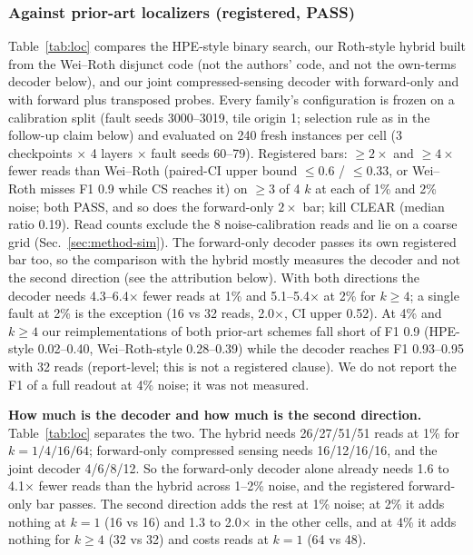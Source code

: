 \documentclass[journal]{IEEEtran}
\begin{document}
\subsubsection{Against prior-art localizers (registered, PASS)}
Table~\ref{tab:loc} compares the HPE-style binary search, our Roth-style hybrid built from the Wei--Roth disjunct code (not the authors' code, and not the own-terms decoder below), and our joint compressed-sensing decoder with forward-only and with forward plus transposed probes. Every family's configuration is frozen on a calibration split (fault seeds 3000--3019, tile origin 1; selection rule as in the follow-up claim below) and evaluated on 240 fresh instances per cell (3 checkpoints $\times$ 4 layers $\times$ fault seeds 60--79). Registered bars: $\ge2\times$ and $\ge4\times$ fewer reads than Wei--Roth (paired-CI upper bound $\le0.6$ / $\le0.33$, or Wei--Roth misses F1 0.9 while CS reaches it) on $\ge3$ of 4 $k$ at each of 1\% and 2\% noise; both PASS, and so does the forward-only $2\times$ bar; kill CLEAR (median ratio 0.19). Read counts exclude the 8 noise-calibration reads and lie on a coarse grid (Sec.~\ref{sec:method-sim}).
The forward-only decoder passes its own registered bar too, so the comparison with the hybrid mostly measures the decoder and not the second direction (see the attribution below).
With both directions the decoder needs 4.3--6.4$\times$ fewer reads at 1\% and 5.1--5.4$\times$ at 2\% for $k\ge4$; a single fault at 2\% is the exception (16 vs 32 reads, 2.0$\times$, CI upper 0.52). At 4\% and $k\ge4$ our reimplementations of both prior-art schemes fall short of F1 0.9 (HPE-style 0.02--0.40, Wei--Roth-style 0.28--0.39) while the decoder reaches F1 0.93--0.95 with 32 reads (report-level; this is not a registered clause). We do not report the F1 of a full readout at 4\% noise; it was not measured.

\textbf{How much is the decoder and how much is the second direction.} Table~\ref{tab:loc} separates the two. The hybrid needs 26/27/51/51 reads at 1\% for $k=1/4/16/64$; forward-only compressed sensing needs 16/12/16/16, and the joint decoder 4/6/8/12. So the forward-only decoder alone already needs 1.6 to 4.1$\times$ fewer reads than the hybrid across 1--2\% noise, and the registered forward-only bar passes. The second direction adds the rest at 1\% noise; at 2\% it adds nothing at $k=1$ (16 vs 16) and 1.3 to 2.0$\times$ in the other cells, and at 4\% it adds nothing for $k\ge4$ (32 vs 32) and costs reads at $k=1$ (64 vs 48).
\end{document}

